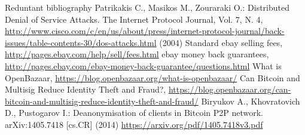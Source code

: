 Reduntant bibliography
     Patrikakis C., Masikos M., Zouraraki O.: Distributed Denial of Service Attacks. The Internet Protocol Journal, Vol. 7,
     N. 4,
     \url{http://www.cisco.com/c/en/us/about/press/internet-protocol-journal/back-issues/table-contents-30/dos-attacks.html}
     (2004)
     Standard ebay selling fees, \url{http://pages.ebay.com/help/sell/fees.html}
     ebay money back guarantees, \url{http://pages.ebay.com/ebay-money-back-guarantee/questions.html}
     What is OpenBazaar, \url{https://blog.openbazaar.org/what-is-openbazaar/}
     Can Bitcoin and Multisig Reduce Identity Theft and Fraud?,
     \url{https://blog.openbazaar.org/can-bitcoin-and-multisig-reduce-identity-theft-and-fraud/}
     Biryukov A., Khovratovich D., Pustogarov I.: Deanonymisation of clients in Bitcoin P2P network. arXiv:1405.7418 [cs.CR]
     (2014)
     \url{https://arxiv.org/pdf/1405.7418v3.pdf}
